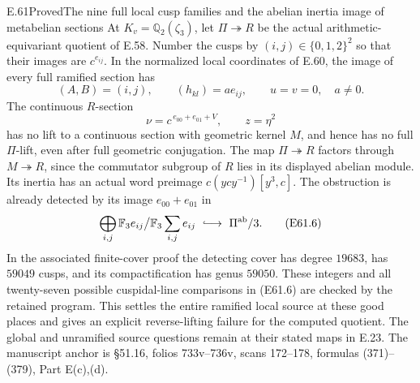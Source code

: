 \begin{statement}{E.61}{Proved}{The nine full local cusp families and the abelian inertia image of metabelian sections}
At $K_v=\mathbb Q_2(\zeta_3)$, let
$\Pi\twoheadrightarrow R$ be the actual arithmetic-equivariant quotient
of E.58. Number the cusps by $(i,j)\in\{0,1,2\}^2$ so that
their images are $c^{e_{ij}}$. In the normalized local
coordinates of E.60, the image of every full ramified section
has
\[
   (A,B)=(i,j),\qquad
   (h_{kl})=a e_{ij},\qquad u=v=0,
       \quad a\ne0.                                  \tag{E61.4}
\]
The continuous $R$-section
\[
       \nu=c^{\,e_{00}+e_{01}+V},\qquad z=\eta^2
 \tag{E61.5}
\]
has no lift to a continuous section with geometric kernel
$M$, and hence has no full $\Pi$-lift, even after full
geometric conjugation. The map $\Pi\twoheadrightarrow R$
factors through $M\twoheadrightarrow R$, since the commutator
subgroup of $R$ lies in its displayed abelian module.
Its inertia has an actual word preimage
$c(ycy^{-1})[y^3,c]$.
The obstruction is already detected by its image
$e_{00}+e_{01}$ in
\[
 \bigoplus_{i,j}\mathbb F_3 e_{ij}\big/
             \mathbb F_3\sum_{i,j}e_{ij}
          \ \lhook\joinrel\longrightarrow\ \Pi^{\rm ab}/3.
 \tag{E61.6}
\]
In the associated finite-cover proof the detecting cover has
degree $19683$, has $59049$ cusps, and its compactification has
genus $59050$. These integers and all twenty-seven possible
cuspidal-line comparisons in (E61.6) are checked by the retained
program. This settles the entire ramified local source at these
good places and gives an explicit reverse-lifting failure for
the computed quotient. The global and unramified source
questions remain at their stated maps in E.23.
The manuscript anchor is \S51.16, folios 733v--736v,
scans 172--178, formulas (371)--(379), Part E(c),(d).
\end{statement}

